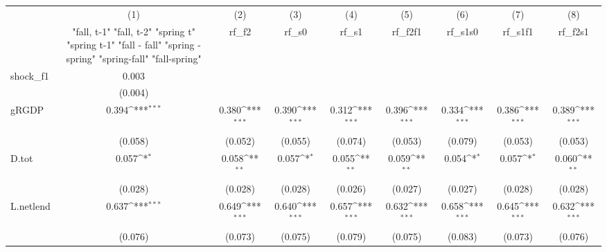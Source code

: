 {
\def\sym#1{\ifmmode^{#1}\else\(^{#1}\)\fi}
\begin{tabular}{l*{8}{c}}
\toprule
            &\multicolumn{1}{c}{(1)}&\multicolumn{1}{c}{(2)}&\multicolumn{1}{c}{(3)}&\multicolumn{1}{c}{(4)}&\multicolumn{1}{c}{(5)}&\multicolumn{1}{c}{(6)}&\multicolumn{1}{c}{(7)}&\multicolumn{1}{c}{(8)}\\
            &\multicolumn{1}{c}{  "fall, t-1" "fall, t-2" "spring t" "spring t-1"  "fall - fall" "spring - spring" "spring-fall" "fall-spring" }&\multicolumn{1}{c}{rf\_f2}&\multicolumn{1}{c}{rf\_s0}&\multicolumn{1}{c}{rf\_s1}&\multicolumn{1}{c}{rf\_f2f1}&\multicolumn{1}{c}{rf\_s1s0}&\multicolumn{1}{c}{rf\_s1f1}&\multicolumn{1}{c}{rf\_f2s1}\\
\midrule
shock\_f1    &       0.003         &                     &                     &                     &                     &                     &                     &                     \\
            &     (0.004)         &                     &                     &                     &                     &                     &                     &                     \\
\addlinespace
gRGDP       &       0.394\sym{***}&       0.380\sym{***}&       0.390\sym{***}&       0.312\sym{***}&       0.396\sym{***}&       0.334\sym{***}&       0.386\sym{***}&       0.389\sym{***}\\
            &     (0.058)         &     (0.052)         &     (0.055)         &     (0.074)         &     (0.053)         &     (0.079)         &     (0.053)         &     (0.053)         \\
\addlinespace
D.tot       &       0.057\sym{*}  &       0.058\sym{**} &       0.057\sym{*}  &       0.055\sym{**} &       0.059\sym{**} &       0.054\sym{*}  &       0.057\sym{*}  &       0.060\sym{**} \\
            &     (0.028)         &     (0.028)         &     (0.028)         &     (0.026)         &     (0.027)         &     (0.027)         &     (0.028)         &     (0.028)         \\
\addlinespace
L.netlend   &       0.637\sym{***}&       0.649\sym{***}&       0.640\sym{***}&       0.657\sym{***}&       0.632\sym{***}&       0.658\sym{***}&       0.645\sym{***}&       0.632\sym{***}\\
            &     (0.076)         &     (0.073)         &     (0.075)         &     (0.079)         &     (0.075)         &     (0.083)         &     (0.073)         &     (0.076)         \\

\end{tabular}}
